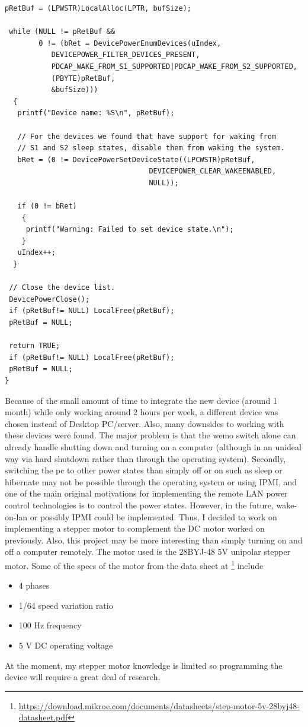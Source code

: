 \documentclass[fontsize=11pt, %
                             paper=letter, %
                             twoside, %
                             captions=tableheading,
                             index=totoc,
                             hyperref]{labbook}
\begin{document}
\begin{addmargin}[0cm]{0cm}
\begin{Verbatim}[tabsize=4]
 pRetBuf = (LPWSTR)LocalAlloc(LPTR, bufSize);

 while (NULL != pRetBuf && 
        0 != (bRet = DevicePowerEnumDevices(uIndex,
           DEVICEPOWER_FILTER_DEVICES_PRESENT,
           PDCAP_WAKE_FROM_S1_SUPPORTED|PDCAP_WAKE_FROM_S2_SUPPORTED,
           (PBYTE)pRetBuf,
           &bufSize)))
  {
   printf("Device name: %S\n", pRetBuf);

   // For the devices we found that have support for waking from 
   // S1 and S2 sleep states, disable them from waking the system.
   bRet = (0 != DevicePowerSetDeviceState((LPCWSTR)pRetBuf, 
                                  DEVICEPOWER_CLEAR_WAKEENABLED, 
                                  NULL));

   if (0 != bRet) 
    {
     printf("Warning: Failed to set device state.\n");
    }
   uIndex++;
  }

 // Close the device list.
 DevicePowerClose();
 if (pRetBuf!= NULL) LocalFree(pRetBuf);
 pRetBuf = NULL;

 return TRUE;
 if (pRetBuf!= NULL) LocalFree(pRetBuf);
 pRetBuf = NULL;
}
\end{Verbatim}

Because of the small amount of time to integrate the new device (around 1 month) while only working around 2 hours per week, a different device was chosen instead of Desktop PC/server. Also, many downsides to working with these devices were found. The major problem is that the wemo switch alone can already handle shutting down and turning on a computer (although in an unideal way via hard shutdown rather than through the operating system). Secondly, switching the pc to other power states than simply off or on such as sleep or hibernate may not be possible through the operating system or using IPMI, and one of the main original motivations for implementing the remote LAN power control technologies is to control the power states. However, in the future, wake-on-lan or possibly IPMI could be implemented.
\smallbreak\noindent
Thus, I decided to work on implementing a stepper motor to complement the DC motor worked on previously. Also, this project may be more interesting than simply turning on and off a computer remotely. The motor used is the 28BYJ-48 5V unipolar stepper motor. Some of the specs of the motor from the data sheet at \footnote{\url{https://download.mikroe.com/documents/datasheets/step-motor-5v-28byj48-datasheet.pdf}} include
\begin{itemize}
\item 4 phases
\item 1/64 speed variation ratio
\item 100 Hz frequency
\item 5 V DC operating voltage
\end{itemize}
At the moment, my stepper motor knowledge is limited so programming the device will require a great deal of research.


\end{addmargin}
\end{document}
